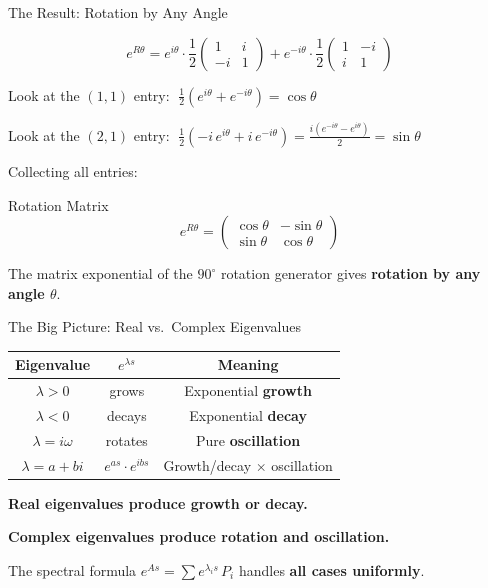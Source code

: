 \documentclass[10pt]{beamer}
\theoremstyle{definition}
\newcommand{\x}[1]{\alert{\textbf{#1}}}
\begin{document}
\begin{frame}{The Result: Rotation by Any Angle}

\vspace{-2mm}
$$e^{R\theta} = e^{i\theta}\cdot\frac{1}{2}\begin{pmatrix}1&i\\-i&1\end{pmatrix} + e^{-i\theta}\cdot\frac{1}{2}\begin{pmatrix}1&-i\\i&1\end{pmatrix}$$

\vfill\pause

Look at the $(1,1)$ entry: $\;\frac{1}{2}(e^{i\theta} + e^{-i\theta}) = \cos\theta$

Look at the $(2,1)$ entry: $\;\frac{1}{2}(-i\,e^{i\theta} + i\,e^{-i\theta}) = \frac{i(e^{-i\theta}-e^{i\theta})}{2} = \sin\theta$

\vfill\pause

Collecting all entries:

\begin{block}{Rotation Matrix}
$$\boxed{e^{R\theta} = \begin{pmatrix}\cos\theta & -\sin\theta \\ \sin\theta & \cos\theta\end{pmatrix}}$$
\end{block}

\vfill

The matrix exponential of the $90^\circ$ rotation generator gives \x{rotation by any angle $\theta$}.

\end{frame}


\begin{frame}{The Big Picture: Real vs.\ Complex Eigenvalues}

\begin{center}
\renewcommand{\arraystretch}{1.8}
{\small
\begin{tabular}{c|c|c}
\textbf{Eigenvalue} & \textbf{$e^{\lambda s}$} & \textbf{Meaning} \\
\hline
$\lambda > 0$ & grows & Exponential \x{growth} \\
$\lambda < 0$ & decays & Exponential \x{decay} \\
$\lambda = i\omega$ & rotates & Pure \x{oscillation} \\
$\lambda = a + bi$ & $e^{as} \cdot e^{ibs}$ & Growth/decay $\times$ oscillation \\
\end{tabular}
}
\end{center}

\vfill\pause

\x{Real eigenvalues produce growth or decay.}

\x{Complex eigenvalues produce rotation and oscillation.}

\vfill

The spectral formula $e^{As} = \sum e^{\lambda_i s}\,P_i$ handles \x{all cases uniformly}.

\end{frame}
\end{document}
